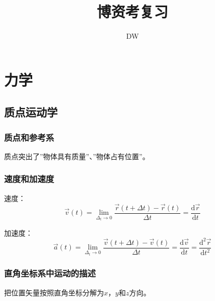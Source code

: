 \documentclass[UTF8]{ctexart}
\title{博资考复习}
\author{DW}
\begin{document}
\maketitle
\newpage
\tableofcontents
\newpage
\section{力学}
	\subsection{质点运动学}
		\subsubsection{质点和参考系}
			\par 质点突出了''物体具有质量''、''物体占有位置''。
		\subsubsection{速度和加速度}
			\par 速度：
			\begin{equation}
				\vec{v}(t) = \lim_{\Delta_t \to 0} \frac{\vec{r}(t+\Delta t)-\vec{r}(t)}{\Delta{t}}= \frac{\mathrm{d}\vec{r}}{\mathrm{d}t}
			\end{equation}
			\par 加速度：
			\begin{equation}
				\vec{a}(t) = \lim_{\Delta_t \to 0} \frac{\vec{v}(t+\Delta t)-\vec{v}(t)}{\Delta{t}}= \frac{\mathrm{d}\vec{v}}{\mathrm{d}t} = \frac{\mathrm{d}^2\vec{r}}{\mathrm{d}t^2}
			\end{equation}
		\subsubsection{直角坐标系中运动的描述}
			\par 把位置矢量按照直角坐标分解为$x$，$y$和$z$方向。
\end{document}

